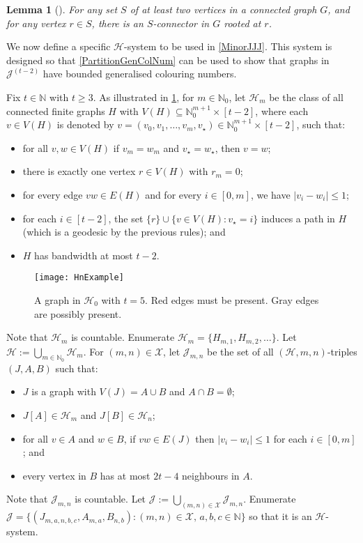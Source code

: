 \documentclass[a4paper,11pt]{article}
\theoremstyle{plain}
\newtheorem{lem}[thm]{Lemma}
\theoremstyle{definition}
\renewcommand{\geq}{\geqslant}
\renewcommand{\leq}{\leqslant}
\newcommand{\XX}{\mathcal{X}}
\newcommand{\HH}{\mathcal{H}}
\newcommand{\JJ}{\mathcal{J}}
\newcommand{\NN}{\mathbb{N}}
\begin{document}
\begin{lem}[\citep{vdHW18}]
\label{ConnectingSubgraph2}
For any set $S$ of at least two vertices in a connected graph $G$, and
for any vertex $r\in S$, there is an $S$-connector in $G$ rooted at $r$. 
\end{lem}

We now define a specific $\HH$-system to be used in \cref{MinorJJJ}. This system is designed so that \cref{PartitionGenColNum} can be used to show that graphs in 
$\JJ^{(t-2)}$ have bounded generalised colouring numbers. 

Fix $t\in\NN$ with $t\geq 3$. As illustrated in \cref{HnExample}, for $m\in\NN_0$, let $\HH_m$ be the class of all connected finite graphs $H$ with $V(H)\subseteq \NN_0^{m+1} \times [t-2]$, where each $v\in V(H)$ is denoted by $v=(v_0,v_1,\dots,v_m,v_\star) \in \NN_0^{m+1}\times[t-2]$, such that:
\begin{itemize}
\item for all $v,w\in V(H)$ if $v_m=w_m$ and $v_\star=w_\star$, then $v=w$; 
\item there is exactly one vertex $r\in V(H)$ with $r_m=0$; 
\item for every edge $vw\in E(H)$ and for every $i\in[0,m]$, we have $|v_i-w_i|\leq 1$;
\item for each $i\in[t-2]$, the set $\{r\}\cup \{v\in V(H): v_\star = i \}$ induces a path in $H$ (which is a geodesic by the previous rules); and
\item $H$ has bandwidth at most $t-2$. 
\end{itemize}

\begin{figure}[!ht]
\centering
\texttt{[image: HnExample]}
\caption{A graph in $\HH_0$ with $t=5$. Red edges must be present. Gray edges are possibly present.}
\label{HnExample}
\end{figure}

Note that $\HH_m$ is countable. 
Enumerate $\HH_m=\{H_{m,1},H_{m,2},\dots\}$. 
Let $\HH:=\bigcup_{m\in\NN_0}\HH_m$.  
For $(m,n)\in\XX$, let $\JJ_{m,n}$ be the set of all $(\HH,m,n)$-triples $(J,A,B)$ such that:
\begin{itemize}
    \item $J$ is a graph with $V(J)=A\cup B$ and $A\cap B =\emptyset$;
    \item $J[A]\in\HH_m$ and $J[B]\in\HH_n$;
    \item for all $v\in A$ and $w\in B$, if $vw\in E(J)$ then 
    $|v_i-w_i|\leq 1$ for each $i\in[0,m]$; and
    \item every vertex in $B$ has at most $2t-4$ neighbours in $A$. 
\end{itemize}
Note that $\JJ_{m,n}$ is countable. 
Let $\JJ:=\bigcup_{(m,n)\in\XX}\JJ_{m,n}$. 
Enumerate $\JJ=\{(J_{m,a,n,b,c},A_{m,a},B_{n,b}):(m,n)\in\XX,\,a,b,c\in\NN\}$ so that it is an $\HH$-system. 
\end{document}
